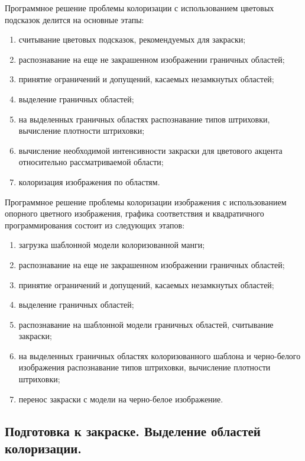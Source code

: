 Программное решение проблемы колоризации с использованием 
цветовых подсказок делится на основные этапы:
\begin{enumerate}
	\item считывание цветовых подсказок, рекомендуемых для закраски;
	\item распознавание на еще не закрашенном изображении граничных областей;
	\item принятие ограничений и допущений, касаемых незамкнутых областей;
	\item выделение граничных областей;
	\item на выделенных граничных областях распознавание типов штриховки, вычисление плотности штриховки;
	\item вычисление необходимой интенсивности закраски для цветового акцента относительно рассматриваемой области;
	\item колоризация изображения по областям.
\end{enumerate}

Программное решение проблемы колоризации изображения с использованием опорного цветного изображения, графика соответствия и квадратичного программирования состоит из следующих этапов:
\begin{enumerate}
	\item загрузка шаблонной модели колоризованной манги;
	\item распознавание на еще не закрашенном изображении граничных областей;
	\item принятие ограничений и допущений, касаемых незамкнутых областей;
	\item выделение граничных областей;
	\item распознавание на шаблонной модели граничных областей, считывание закраски;
    \item на выделенных граничных областях колоризованного шаблона и черно-белого
изображения распознавание типов штриховки, вычисление плотности штриховки;
   \item перенос закраски с модели на черно-белое изображение.
\end{enumerate}

\subsection{Подготовка к закраске. Выделение областей колоризации.}


